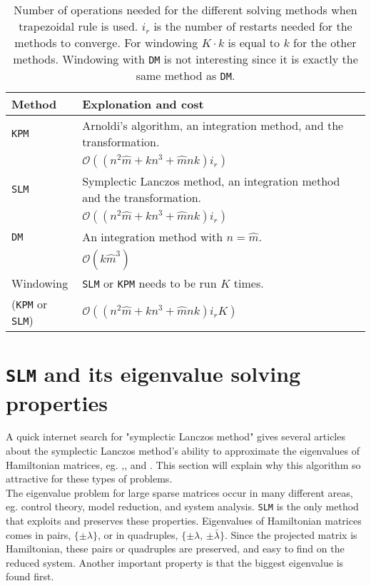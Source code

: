 \begin{table}
\caption{ Number of operations needed for the different solving methods when trapezoidal rule is used. $i_r$ is the number of restarts needed for the methods to converge. For windowing $K\cdot k$ is equal to $k$ for the other methods. Windowing with \texttt{DM} is not interesting since it is exactly the same method as \texttt{DM}. }
\centering
\begin{tabular}{l | l}
Method & Explonation and cost \\
\hline
\texttt{KPM} & Arnoldi's algorithm, an integration method, and the transformation.
\\ & $ \mathcal{O}((n^2 \hat{m} + k n^3 + \hat{m}nk)i_r)$ \\ 
\texttt{SLM} & Symplectic Lanczos method, an integration method and the transformation. 
\\ & $ \mathcal{O}((n^2 \hat{m} + k n^3 + \hat{m}nk)i_r) $  \\
\texttt{DM} & An integration method with $n = \hat{m}$. 
\\  & $\mathcal{O}(k\hat{m}^3)$ \\
Windowing  & \texttt{SLM} or \texttt{KPM} needs to be run $K$ times. \\ (\texttt{KPM} or \texttt{SLM}) & $\mathcal{O}((n^2 \hat{m} + k n^3 + \hat{m}nk)i_r K)$ \\
\end{tabular}
\label{tab:cc}

\end{table}



\section{\texttt{SLM} and its eigenvalue solving properties} %
A quick internet search for "symplectic Lanczos method" gives several articles about the symplectic Lanczos method's ability to approximate the eigenvalues of Hamiltonian matrices, eg. \cite{SLM1},\cite{SLM2}, and \cite{SLM4}. This section will explain why this algorithm so attractive for these types of problems. \\

\noindent The eigenvalue problem for large sparse matrices occur in many different areas, eg. control theory, model reduction, and system analysis. 
\texttt{SLM} is the only method that exploits and preserves these properties. Eigenvalues of Hamiltonian matrices comes in pairs, $\{ \pm \lambda \} $, or in quadruples, $\{ \pm \lambda $, $\pm \bar{\lambda} \} $. Since the projected matrix is Hamiltonian, these pairs or quadruples are preserved, and easy to find on the reduced system. Another important property is that the biggest eigenvalue is found first.  \\

